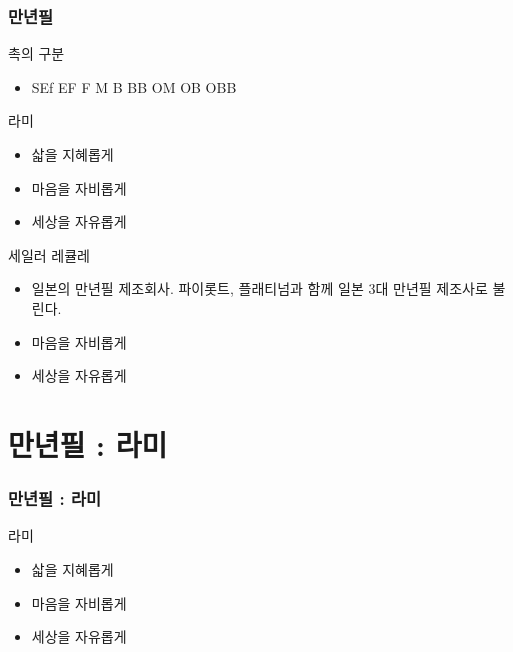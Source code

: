 \documentclass[aspectratio=1610,20pt,xcolor=pdftex,dvipsnames,table,handout]{beamer}
\begin{document}
		\begin{frame} [t,plain]
		\frametitle{만년필}

			\begin{block} {촉의 구분}
			\setlength{\leftmargini}{2em}			
			\begin{itemize}
				\item SEf EF F M B BB OM OB OBB
			\end{itemize}
			\end{block}						


			\begin{block} {라미}
			\setlength{\leftmargini}{2em}			
			\begin{itemize}
				\item 삷을 지혜롭게
				\item 마음을 자비롭게
				\item 세상을 자유롭게
			\end{itemize}
			\end{block}						

			\begin{block} {세일러 레큘레}
			\setlength{\leftmargini}{2em}			
			\begin{itemize}
				\item 일본의 만년필 제조회사. 파이롯트, 플래티넘과 함께 일본 3대 만년필 제조사로 불린다.
				\item 마음을 자비롭게
				\item 세상을 자유롭게
			\end{itemize}
			\end{block}						

		\end{frame}						


		\section{만년필 : 라미 }

		\begin{frame} [t,plain]
		\frametitle{만년필 : 라미}

			\begin{block} {라미}
			\setlength{\leftmargini}{2em}			
			\begin{itemize}
				\item 삷을 지혜롭게
				\item 마음을 자비롭게
				\item 세상을 자유롭게
			\end{itemize}
			\end{block}						

		\end{frame}						
\end{document}
